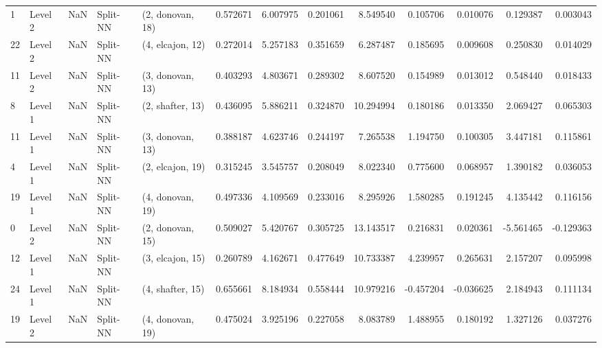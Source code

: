 \begin{tabular}{llrllrrrrrrrr}
1  &   Level 2 &    NaN &       Split-NN &  (2, donovan, 18) &   0.572671 &   6.007975 &  0.201061 &   8.549540 &             0.105706 &               0.010076 &            0.129387 &              0.003043 \\
22 &   Level 2 &    NaN &       Split-NN &  (4, elcajon, 12) &   0.272014 &   5.257183 &  0.351659 &   6.287487 &             0.185695 &               0.009608 &            0.250830 &              0.014029 \\
11 &   Level 2 &    NaN &       Split-NN &  (3, donovan, 13) &   0.403293 &   4.803671 &  0.289302 &   8.607520 &             0.154989 &               0.013012 &            0.548440 &              0.018433 \\
8  &   Level 1 &    NaN &       Split-NN &  (2, shafter, 13) &   0.436095 &   5.886211 &  0.324870 &  10.294994 &             0.180186 &               0.013350 &            2.069427 &              0.065303 \\
11 &   Level 1 &    NaN &       Split-NN &  (3, donovan, 13) &   0.388187 &   4.623746 &  0.244197 &   7.265538 &             1.194750 &               0.100305 &            3.447181 &              0.115861 \\
4  &   Level 1 &    NaN &       Split-NN &  (2, elcajon, 19) &   0.315245 &   3.545757 &  0.208049 &   8.022340 &             0.775600 &               0.068957 &            1.390182 &              0.036053 \\
19 &   Level 1 &    NaN &       Split-NN &  (4, donovan, 19) &   0.497336 &   4.109569 &  0.233016 &   8.295926 &             1.580285 &               0.191245 &            4.135442 &              0.116156 \\
0  &   Level 2 &    NaN &       Split-NN &  (2, donovan, 15) &   0.509027 &   5.420767 &  0.305725 &  13.143517 &             0.216831 &               0.020361 &           -5.561465 &             -0.129363 \\
12 &   Level 1 &    NaN &       Split-NN &  (3, elcajon, 15) &   0.260789 &   4.162671 &  0.477649 &  10.733387 &             4.239957 &               0.265631 &            2.157207 &              0.095998 \\
24 &   Level 1 &    NaN &       Split-NN &  (4, shafter, 15) &   0.655661 &   8.184934 &  0.558444 &  10.979216 &            -0.457204 &              -0.036625 &            2.184943 &              0.111134 \\
19 &   Level 2 &    NaN &       Split-NN &  (4, donovan, 19) &   0.475024 &   3.925196 &  0.227058 &   8.083789 &             1.488955 &               0.180192 &            1.327126 &              0.037276 \\

\end{tabular}
